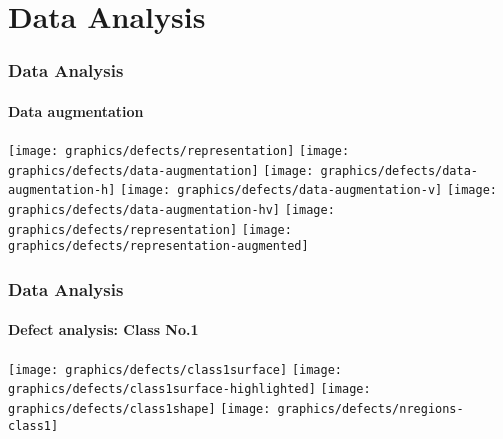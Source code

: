 \section{Data Analysis}

    \begin{frame}
        \frametitle{Data Analysis}
        \framesubtitle{Data augmentation}
        \centering
         {
            \texttt{[image: graphics/defects/representation]}
        }
         {
            \texttt{[image: graphics/defects/data-augmentation]}
        }
         {
            \texttt{[image: graphics/defects/data-augmentation-h]}
        }
         {
            \texttt{[image: graphics/defects/data-augmentation-v]}
        }
         {
            \texttt{[image: graphics/defects/data-augmentation-hv]}
        }
         {
            \texttt{[image: graphics/defects/representation]}
        }
         {
            \texttt{[image: graphics/defects/representation-augmented]}
        }
    \end{frame}

    \begin{frame}
        \frametitle{Data Analysis}
        \framesubtitle{Defect analysis: Class No.1}
         {
            \texttt{[image: graphics/defects/class1surface]}
        }
         {
            \texttt{[image: graphics/defects/class1surface-highlighted]}
        }
         {
            \texttt{[image: graphics/defects/class1shape]}
        }
         {
            \texttt{[image: graphics/defects/nregions-class1]}
        }
    \end{frame}


